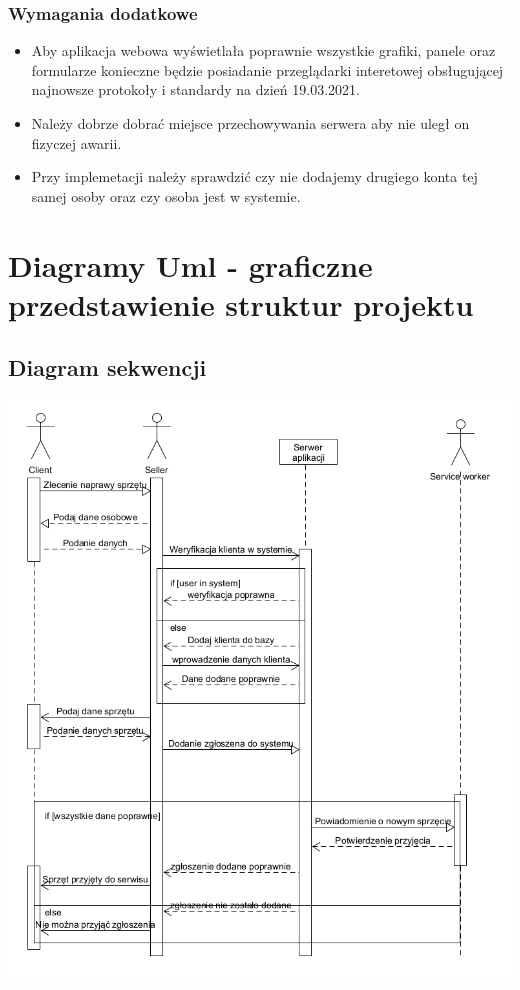 \documentclass{article}
\begin{document}
\subsubsection{Wymagania dodatkowe}
\begin{itemize}
    \item Aby aplikacja webowa wyświetlała poprawnie wszystkie grafiki, panele oraz formularze konieczne będzie posiadanie przeglądarki interetowej obsługującej najnowsze protokoły i standardy na dzień 19.03.2021.
    \item Należy dobrze dobrać miejsce przechowywania serwera aby nie uległ on fizyczej awarii.
    \item Przy implemetacji należy sprawdzić czy nie dodajemy drugiego konta tej samej osoby oraz czy osoba jest w systemie.
\end{itemize}
\section{Diagramy Uml - graficzne przedstawienie struktur projektu}
\subsection{Diagram sekwencji}
\includegraphics[scale=0.5]{diagrams/sequence_diagram.png}
\end{document}
